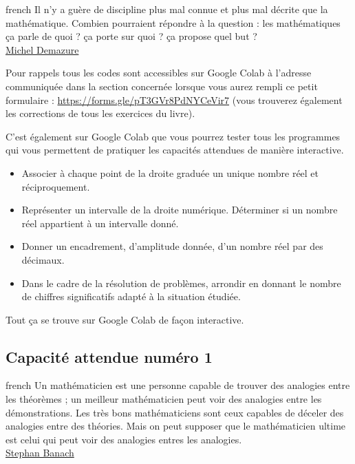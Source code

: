 \documentclass[a4paper, 11pt, twoside]{article}
\begin{document}
\begin{foreigndisplayquote}{french}
Il n’y a guère de discipline plus mal connue et plus mal décrite
que la mathématique. Combien pourraient répondre à la question :
les mathématiques ça parle de quoi ? ça porte sur quoi ? ça propose
quel but ?\\

\href{https://fr.wikipedia.org/wiki/Michel\_Demazure}{Michel Demazure}
\end{foreigndisplayquote}

\startcontents[level-2]


Pour rappels tous les codes sont accessibles sur Google Colab à
l'adresse communiquée dans la section concernée lorsque vous
aurez rempli ce petit formulaire :
\url{https://forms.gle/pT3GVr8PdNYCeVir7} (vous trouverez également
les corrections de tous les exercices du livre).

C'est également sur Google Colab que vous pourrez tester tous les
programmes qui vous permettent de pratiquer les capacités attendues
de manière interactive.

\begin{itemize}
\item Associer à chaque point de la droite graduée un unique nombre réel
et réciproquement.
\item Représenter un intervalle de la droite numérique. Déterminer si un
nombre réel appartient à un intervalle donné.
\item Donner un encadrement, d'amplitude donnée, d'un nombre réel par
des décimaux.
\item Dans le cadre de la résolution de problèmes, arrondir en donnant
le nombre de chiffres significatifs adapté à la situation étudiée.
\end{itemize}

Tout ça se trouve sur Google Colab de façon interactive.
\stopcontents[level-2]

\subsection{Capacité attendue numéro 1}
\label{sec:org5bec0e4}

\begin{foreigndisplayquote}{french}
Un mathématicien est une personne capable de trouver des analogies
entre les théorèmes ; un meilleur mathématicien peut voir des
analogies entre les démonstrations. Les très bons mathématiciens
sont ceux capables de déceler des analogies entre des
théories. Mais on peut supposer que le mathématicien ultime est
celui qui peut voir des analogies entres les analogies.\\

\href{https://fr.wikipedia.org/wiki/Stefan\_Banach}{Stephan Banach}
\end{foreigndisplayquote}
\end{document}
